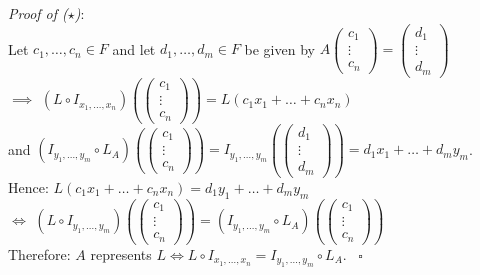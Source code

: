 \documentclass[
  12pt,
  a4paper,
  twoside]{article}
\theoremstyle{plain}
\theoremstyle{definition}
\begin{document}
\emph{Proof of (\(\star\))}:\\
Let \(c_{1} , \dots, c_{n} \in F\) and let \(d_{1}, \dots, d_{m} \in F\) be given by
\(A \begin{pmatrix} c_{1} \\ \vdots \\ c_{n} \end{pmatrix} = \begin{pmatrix} d_{1} \\ \vdots \\ d_{m} \end{pmatrix}\)\\
\(\implies\) \((L \circ I_{x_{1} , \dots, x_{n}}) \left( \begin{pmatrix} c_{1} \\ \vdots \\ c_{n} \end{pmatrix} \right) = L(c_1x_1+\dots+c_nx_n)\)\\
\hspace*{0.333em}\hspace*{0.333em}\hspace*{0.333em}\hspace*{0.333em}\hspace*{0.333em}\hspace*{0.333em} and \((I_{y_1,\dots,y_m}\circ L_A)\left(\begin{pmatrix} c_{1} \\ \vdots \\ c_{n} \end{pmatrix} \right) = I_{y_1,\dots,y_m}\left(\begin{pmatrix} d_{1} \\ \vdots \\ d_{m} \end{pmatrix}\right) = d_1x_1+\dots+d_my_m\).\\
Hence: \(L(c_{1}x_{1} + \dots + c_{n}x_{n}) = d_{1}y_{1} + \dots + d_{m}y_{m}\)\\
\(\iff\) \((L \circ I_{y_{1}, \dots, y_{m}}) \left( \begin{pmatrix} c_{1} \\ \vdots \\ c_{n} \end{pmatrix} \right) = ( I_{y_{1}, \dots, y_{m}} \circ L_{A}) \left( \begin{pmatrix} c_{1} \\ \vdots \\ c_{n} \end{pmatrix} \right)\)\\
Therefore: \(A\) represents \(L \iff L \circ I_{x_{1}, \dots, x_{n}} = I_{y_{1}, \dots, y_{m}} \circ L_{A}\).
\hfill~{\(\square\)}
\end{document}
